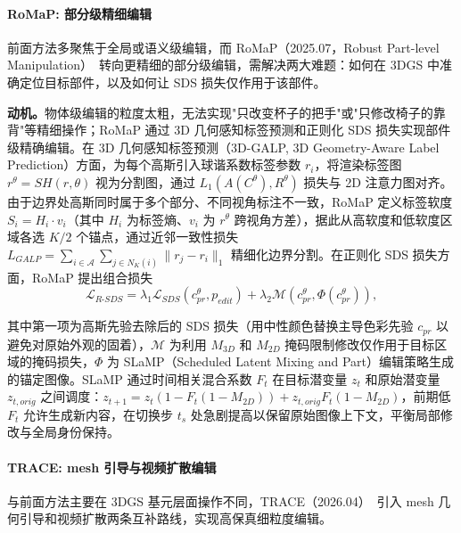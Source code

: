 \paragraph{RoMaP: 部分级精细编辑}

前面方法多聚焦于全局或语义级编辑，而 RoMaP（2025.07，Robust Part-level Manipulation）~\cite{2507_11061}转向更精细的部分级编辑，需解决两大难题：如何在 3DGS 中准确定位目标部件，以及如何让 SDS 损失仅作用于该部件。

\textbf{动机。}物体级编辑的粒度太粗，无法实现"只改变杯子的把手"或"只修改椅子的靠背"等精细操作；RoMaP 通过 3D 几何感知标签预测和正则化 SDS 损失实现部件级精确编辑。在 3D 几何感知标签预测（3D-GALP, 3D Geometry-Aware Label Prediction）方面，为每个高斯引入球谐系数标签参数 $r_i$，将渲染标签图 $r^\theta = SH(r, \theta)$ 视为分割图，通过 $L_1(A(C^\theta), R^\theta)$ 损失与 2D 注意力图对齐。由于边界处高斯同时属于多个部分、不同视角标注不一致，RoMaP 定义标签软度 $S_i = H_i \cdot v_i$（其中 $H_i$ 为标签熵、$v_i$ 为 $r^\theta$ 跨视角方差），据此从高软度和低软度区域各选 $K/2$ 个锚点，通过近邻一致性损失 $L_{GALP} = \sum_{i \in \mathcal{A}}\sum_{j \in N_K(i)}\|r_j - r_i\|_1$ 精细化边界分割。在正则化 SDS 损失方面，RoMaP 提出组合损失
\begin{equation}
\mathcal{L}_{R\text{-}SDS} = \lambda_1 \mathcal{L}_{SDS}(c^\theta_{pr}, p_{edit}) + \lambda_2 \mathcal{M}(c^\theta_{pr}, \Phi(c^\theta_{pr})),
\end{equation}

其中第一项为高斯先验去除后的 SDS 损失（用中性颜色替换主导色彩先验 $c_{pr}$ 以避免对原始外观的固着），$\mathcal{M}$ 为利用 $M_{3D}$ 和 $M_{2D}$ 掩码限制修改仅作用于目标区域的掩码损失，$\Phi$ 为 SLaMP（Scheduled Latent Mixing and Part）编辑策略生成的锚定图像。SLaMP 通过时间相关混合系数 $F_t$ 在目标潜变量 $z_t$ 和原始潜变量 $z_{t,orig}$ 之间调度：$z_{t+1} = z_t(1 - F_t(1-M_{2D})) + z_{t,orig}F_t(1-M_{2D})$，前期低 $F_t$ 允许生成新内容，在切换步 $t_s$ 处急剧提高以保留原始图像上下文，平衡局部修改与全局身份保持。

\paragraph{TRACE: mesh 引导与视频扩散编辑}

与前面方法主要在 3DGS 基元层面操作不同，TRACE（2026.04）~\cite{2604_01207}引入 mesh 几何引导和视频扩散两条互补路线，实现高保真细粒度编辑。

